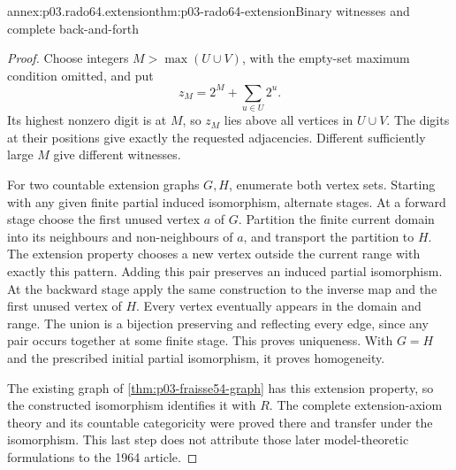 \begin{annexitem}{annex:p03.rado64.extension}{thm:p03-rado64-extension}{Binary witnesses and complete back-and-forth}
\begin{proof}
Choose integers \(M>\max(U\cup V)\), with the empty-set maximum
condition omitted, and put
\[
 z_M=2^M+\sum_{u\in U}2^u.
\]
Its highest nonzero digit is at \(M\), so \(z_M\) lies above all vertices
in \(U\cup V\). The digits at their positions give exactly the requested
adjacencies. Different sufficiently large \(M\) give different witnesses.

For two countable extension graphs \(G,H\), enumerate both vertex sets.
Starting with any given finite partial induced isomorphism, alternate stages.
At a forward stage choose the first unused vertex \(a\) of \(G\).
Partition the finite current domain into its neighbours and non-neighbours
of \(a\), and transport the partition to \(H\). The extension property
chooses a new vertex outside the current range with exactly this pattern.
Adding this pair preserves an induced partial isomorphism.
At the backward stage apply the same construction to the inverse map and
the first unused vertex of \(H\).
Every vertex eventually appears in the domain and range. The union is a
bijection preserving and reflecting every edge, since any pair occurs
together at some finite stage. This proves uniqueness. With \(G=H\)
and the prescribed initial partial isomorphism, it proves homogeneity.

The existing graph of \cref{thm:p03-fraisse54-graph} has this extension
property, so the constructed isomorphism identifies it with \(R\).
The complete extension-axiom theory and its countable categoricity were
proved there and transfer under the isomorphism. This last step does not
attribute those later model-theoretic formulations to the 1964 article.
\end{proof}
\end{annexitem}

